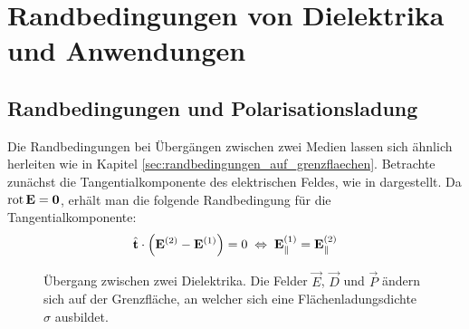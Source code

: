 \section{Randbedingungen von Dielektrika und Anwendungen\label{sec:randbedingungen_von_dielektrika}}



\subsection{Randbedingungen und Polarisationsladung}

Die Randbedingungen bei Übergängen zwischen zwei Medien lassen sich ähnlich herleiten wie in Kapitel \ref{sec:randbedingungen_auf_grenzflaechen}. Betrachte zunächst die Tangentialkomponente des elektrischen Feldes, wie in  dargestellt. Da $\operatorname{rot} \mathbf{E}=\mathbf{0}$, erhält man die folgende Randbedingung für die Tangentialkomponente:
\begin{equation*}
	\hat{\mathbf{t}}\cdot \left(\mathbf{E}^{\left(2\right)}-\mathbf{E}^{\left(1\right)}\right)=0\;\Leftrightarrow\; \mathbf{E}_{\parallel }^{\left(1\right)}=\mathbf{E}_{\parallel }^{\left(2\right)}
\end{equation*}


\begin{figure}[htb]
	\centering
	\tFigRandbedingungenDielektrikum
	\caption{Übergang zwischen zwei Dielektrika. Die Felder $\vec E$, $\vec D$ und $\vec P$ ändern sich auf der Grenzfläche, an welcher sich eine Flächenladungsdichte $\sigma$ ausbildet. }
	\label{fig:bc_dielectrica}
\end{figure}

